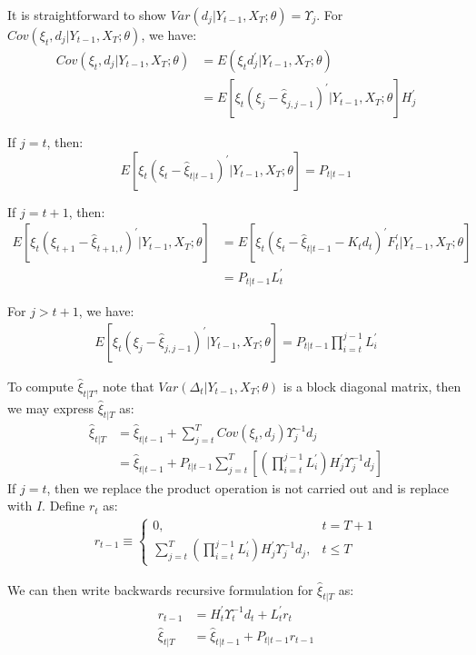 \documentclass[12pt]{article}
\numberwithin{equation}{section}
\begin{document}
It is straightforward to show $Var(d_j|Y_{t-1},X_T;\theta)=\Upsilon_j$. For $Cov(\xi_t,d_j|Y_{t-1},X_T;\theta)$, we have:
\begin{align*}
    Cov(\xi_t,d_j|Y_{t-1},X_T;\theta) &= E(\xi_td_j^{'}|Y_{t-1},X_T;\theta) \\
    &= E[\xi_t(\xi_j-\hat{\xi}_{j,j-1})^{'}|Y_{t-1},X_T;\theta]H_j^{'} 
\end{align*}

If $j=t$, then:
\[
    E[\xi_t(\xi_t-\hat{\xi}_{t|t-1})^{'}|Y_{t-1},X_T;\theta] = P_{t|t-1}
\]

If $j=t+1$, then:
\begin{align*}
    E[\xi_t(\xi_{t+1}-\hat{\xi}_{t+1,t})^{'}|Y_{t-1},X_T;\theta] &= E[\xi_t(\xi_t-\hat{\xi}_{t|t-1}-K_td_t)^{'}F_t^{'}|Y_{t-1},X_T;\theta] \\
    &= P_{t|t-1}L_t^{'}
\end{align*}

For $j>t+1$, we have:
\begin{align*}
    E[\xi_t(\xi_{j}-\hat{\xi}_{j,j-1})^{'}|Y_{t-1},X_T;\theta] = P_{t|t-1}\prod_{i=t}^{j-1}L_i^{'}
\end{align*}

To compute $\hat{\xi}_{t|T}$, note that $Var(\Delta_{t}|Y_{t-1},X_T;\theta)$ is a block diagonal matrix, then we may express $\hat{\xi}_{t|T}$ as:
\begin{align*}
    \hat{\xi}_{t|T} &= \hat{\xi}_{t|t-1} + \sum_{j=t}^{T}Cov(\xi_t,d_j)\Upsilon_j^{-1}d_j \\
    &= \hat{\xi}_{t|t-1} + P_{t|t-1}\sum_{j=t}^T\left[\left(\prod_{i=t}^{j-1}L_{i}^{'}\right)H_j^{'}\Upsilon_j^{-1}d_j\right]
\end{align*}
If $j=t$, then we replace the product operation is not carried out and is replace with $I$. Define $r_t$ as:
\begin{align*}
    r_{t-1} \equiv \begin{cases}
        0, & t=T+1 \\
        \sum_{j=t}^T\left(\prod_{i=t}^{j-1}L_{i}^{'}\right)H_j^{'}\Upsilon_j^{-1}d_j, & t\leq T
    \end{cases}
\end{align*}

We can then write backwards recursive formulation for $\hat{\xi}_{t|T}$ as:
\begin{align*}
    r_{t-1} &= H_t^{'}\Upsilon_t^{-1}d_t + L_t^{'}r_t \\
    \hat{\xi}_{t|T} &= \hat{\xi}_{t|t-1} + P_{t|t-1}r_{t-1} 
\end{align*}
\end{document}
